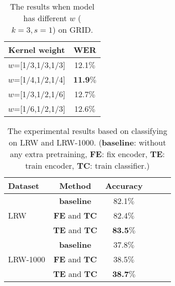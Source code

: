 \documentclass[a4paper, 10pt, conference]{ieeeconf}      %
\begin{document}
	\begin{table}[H]
		\caption{The results when model has different $w$ ($k=3,s=1$) on GRID.} \label{table3}
		\centering
		\begin{tabular}{|c||c|}    
			\hline
			Kernel weight&     WER   \\
			\hline
			\hline
			$w$=[1/3,1/3,1/3]& 12.1$\%$\\
			$w$=[1/4,1/2,1/4]&\textbf{11.9$\%$} \\
			$w$=[1/3,1/2,1/6]&12.7$\%$ \\
			$w$=[1/6,1/2,1/3]&12.6$\%$ \\  
			\hline
		\end{tabular}
	\end{table}
	\vspace{-0.4cm}
	\begin{table}[H]
		\setlength{\abovecaptionskip}{0.6cm}   %
		\setlength{\belowcaptionskip}{0cm} 
		\centering
		\caption{The experimental results based on classifying on LRW and LRW-1000. (\textbf{baseline}: without any extra pretraining, \textbf{FE}: fix encoder, \textbf{TE}: train encoder, \textbf{TC}: train classifier.) 
			\vspace{-0.6cm}} \label{table4}
		\begin{tabular}{|p{1.39cm}|c|c|ccr}    
			\hline
			Dataset & Method&  Accuracy \\
			\hline
			\hline
			\multirow{3}{*}{LRW}&\textbf{baseline} & 82.1$\%$  \\
			~&\textbf{FE} and \textbf{TC}&  82.4$\%$ \\
			~&\textbf{TE} and \textbf{TC} & \textbf{83.5}$\%$  \\
			\hline
			\multirow{3}{*}{LRW-1000}&\textbf{baseline} & 37.8$\%$      \\
			~&\textbf{FE} and \textbf{TC} &  38.5$\%$     \\
			~&\textbf{TE} and \textbf{TC} &\textbf{38.7}$\%$      \\
			\hline
		\end{tabular}
		
	\end{table}
	
	\vspace{-0.5cm}
\end{document}
